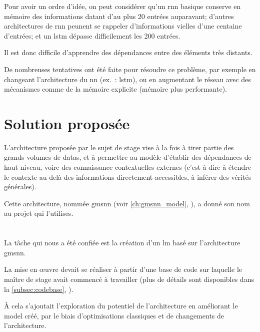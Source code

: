 Pour avoir un ordre d'idée, on peut considérer qu'un \gls{rnn} basique conserve en mémoire des informations datant d'au plus 20 entrées auparavant; d'autres architectures de \gls{rnn} peunent se rappeler d'informations vielles d'une centaine d'entrées; et un \gls{lstm} dépasse difficilement les 200 entrées.

Il est donc difficile d'apprendre des dépendances entre des éléments très distants.

De nombreuses tentatives ont été faite pour résoudre ce problème, par exemple en changeant l'architecture du \gls{nn} (ex.~: \gls{lstm}), ou en augmentant le réseau avec des mécanismes comme de la mémoire explicite (mémoire plus performante).

\pagebreak
\section{Solution proposée}\label{sec:soluce}
L'architecture proposée par le sujet de stage vise à la fois à tirer partie des grands volumes de \glspl{data}, et à permettre au modèle d'établir des dépendances de haut niveau, voire des connaissance contextuelles externes (c'est-à-dire à étendre le contexte au-delà des informations directement accessibles, à inférer des vérités générales).

Cette architecture, nommée \gls{gmsnn} (voir \autoref{ch:gmsnn_model}, ), a donné son nom au projet qui l'utilises.



\section{}
La tâche qui nous a été confiée est la création d'un \gls{lm} basé sur l'architecture \gls{gmsnn}.

La mise en œuvre devait se réaliser à partir d'une base de code sur laquelle le maître de stage avait commencé à travailler (plus de détails sont disponibles dans la \autoref{subsec:codebase}, ).

À cela s'ajoutait l'exploration du potentiel de l'architecture en améliorant le \gls{model} créé, par le biais d'optimisations classiques et de changements de l'architecture.

